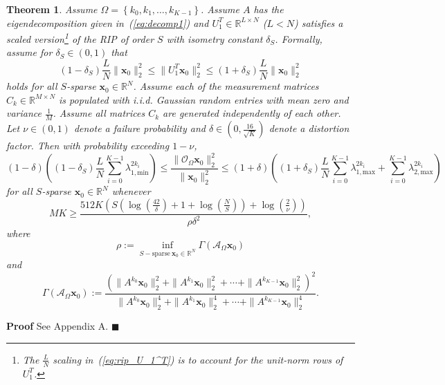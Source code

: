 \documentclass[11pt,draftcls,onecolumn]{IEEEtran}
\def\real    { \mathbb{R} }
\newtheorem{theorem}{Theorem}
\def \ok {{\mathcal{O}_{\Omega}}}
\def \ak {{\mathcal{A}_{\Omega}}}
\newcommand{\vc}[1]{\boldsymbol{#1}}
\def\real    { \mathbb{R} }
\begin{document}
\begin{theorem}
Assume $\Omega = \left\{k_0, k_1, \dots, k_{K-1}\right\}$.
Assume $A$ has the eigendecomposition given in~(\ref{eq:decomp1}) and $U_1^T \in \real^{L \times N}$ ($L < N$) satisfies a scaled version\footnote{The $\frac{L}{N}$
scaling in~(\ref{eq:rip_U_1^T}) is to account for the unit-norm rows of $U_1^T$.} of the \ac{RIP} of order $S$ with isometry constant $\delta_S$. Formally, assume for $\delta_S \in (0,1)$ that
\begin{equation}
(1-\delta_S)\frac{L}{N}\|\vc{x}_0\|_2^2 \leq \|U_1^T\vc{x}_0\|_2^2 \leq (1+\delta_S)\frac{L}{N}\|\vc{x}_0\|_2^2
\label{eq:rip_U_1^T}
\end{equation}
holds for all $S$-sparse $\vc{x}_0 \in \real^N$.
Assume each of the measurement matrices $C_k \in \real^{M \times N}$ is populated with \ac{i.i.d.} Gaussian random entries with mean zero and variance $\frac{1}{M}$. Assume all matrices $C_k$ are generated independently of each other.
Let $\nu \in (0,1)$ denote a failure probability and $\delta \in (0,\frac{16}{\sqrt{K}})$ denote a distortion factor. Then with probability exceeding $1-\nu$,
\begin{equation}
(1-\delta)\left((1-\delta_S)\frac{L}{N}\sum_{i=0}^{K-1}\lambda_{1,\text{min}}^{2k_i}\right) \leq \frac{\|\ok\vc{x}_0\|_2^2}{\|\vc{x}_0\|_2^2} \leq (1+\delta)\left((1+\delta_S)\frac{L}{N}\sum_{i=0}^{K-1}\lambda_{1,\text{max}}^{2k_i} +  \sum_{i=0}^{K-1}\lambda_{2,\text{max}}^{2k_i}\right)
\label{eq:rip_ok_symmetric_A}
\end{equation}
for all $S$-sparse $\vc{x}_0 \in \real^N$ whenever
\begin{equation}
MK \geq \frac{512K\left(S\left(\log(\frac{42}{\delta})+ 1 + \log(\frac{N}{S})\right) + \log(\frac{2}{\nu})\right)}{\rho\delta^2},
\end{equation}
where
\begin{equation}
\rho := \inf_{S-\text{sparse}~\vc{x}_0 \in \real^N} \Gamma(\ak\vc{x}_0)
\label{eq:def_min_Gamma}
\end{equation}
and
\begin{equation*}
\Gamma\left(\ak \vc{x}_0\right) := \frac{\left( \|A^{k_0}\vc{x}_0\|_2^2 + \|A^{k_1} \vc{x}_{0}\|_2^2 + \cdots + \|A^{k_{K-1}} \vc{x}_0\|_2^2\right)^2}{\|A^{k_0}\vc{x}_0\|_2^4 + \|A^{k_1} \vc{x}_{0}\|_2^4 + \cdots + \|A^{k_{K-1}} \vc{x}_0\|_2^4}.
\end{equation*}
\label{theo:rip_ok_symmetric_A}
\end{theorem}
{\textbf{Proof} See Appendix A.} \hfill $\blacksquare$
\end{document}
